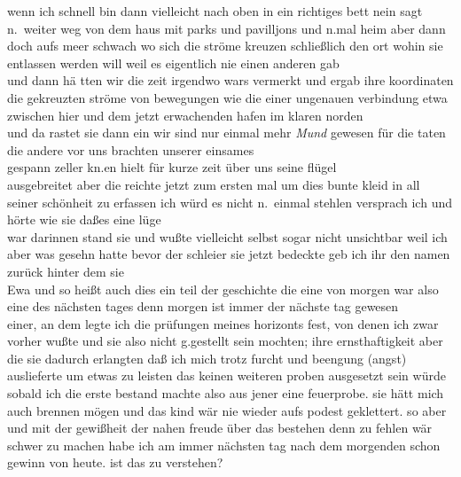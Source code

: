 \documentclass[
]{article}
\begin{document}
wenn ich schnell bin dann vielleicht nach oben in ein richtiges bett
nein sagt n.~weiter weg von dem haus mit parks und pavilljons und n.mal
heim aber dann doch aufs meer schwach wo sich die ströme kreuzen
schließlich den ort wohin sie entlassen werden will weil es eigentlich
nie einen anderen gab\\
und dann hä tten wir die zeit irgendwo wars vermerkt und ergab ihre
koordinaten die gekreuzten ströme von bewegungen wie die einer ungenauen
verbindung etwa zwischen hier und dem jetzt erwachenden hafen im klaren
norden\\
und da rastet sie dann ein wir sind nur einmal mehr \emph{Mund }gewesen
für die taten die andere vor uns brachten unserer einsames\\
gespann zeller kn.en hielt für kurze zeit über uns seine flügel\\
ausgebreitet aber die reichte jetzt zum ersten mal um dies bunte kleid
in all seiner schönheit zu erfassen ich würd es nicht n.~einmal stehlen
versprach ich und hörte wie sie daßes eine lüge\\
war darinnen stand sie und wußte vielleicht selbst sogar nicht
unsichtbar weil ich aber was gesehn hatte bevor der schleier sie jetzt
bedeckte geb ich ihr den namen zurück hinter dem sie\\
Ewa und so heißt auch dies ein teil der geschichte die eine von morgen
war also eine des nächsten tages denn morgen ist immer der nächste tag
gewesen\\
einer, an dem legte ich die prüfungen meines horizonts fest, von denen
ich zwar vorher wußte und sie also nicht g.gestellt sein mochten; ihre
ernsthaftigkeit aber die sie dadurch erlangten daß ich mich trotz furcht
und beengung (angst) auslieferte um etwas zu leisten das keinen weiteren
proben ausgesetzt sein würde sobald ich die erste bestand machte also
aus jener eine feuerprobe. sie hätt mich auch brennen mögen und das kind
wär nie wieder aufs podest geklettert. so aber und mit der gewißheit der
nahen freude über das bestehen denn zu fehlen wär schwer zu machen habe
ich am immer nächsten tag nach dem morgenden schon gewinn von heute. ist
das zu verstehen?
\end{document}
